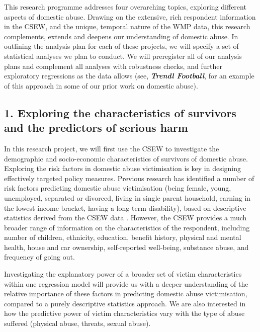 \documentclass[11pt, a4paper]{article}
\newcommand{\NS}[1] {{\textcolor{green}{#1}}}
\begin{document}
This research programme addresses four overarching topics, exploring different aspects of domestic abuse. Drawing on the extensive, rich respondent information in the CSEW, and the unique, temporal nature of the WMP data, this research complements, extends and deepens our understanding of domestic abuse. In outlining the analysis plan for each of these projects, we will specify a set of statistical analyses we plan to conduct. We will preregister all of our analysis plans and complement all analyses with robustness checks, and further exploratory regressions as the data allows (see, \textbf{\textit{Trendl Football}}, for an example of this approach in some of our prior work on domestic abuse).

\subsection*{1. Exploring the characteristics of survivors and the predictors of serious harm}


In this research project, we will first use the CSEW to investigate the demographic and socio-economic characteristics of survivors of domestic abuse. Exploring the risk factors in domestic abuse victimisation is key in designing effectively targeted policy measures. Previous research has identified a number of risk factors predicting domestic abuse victimisation (being female, young, unemployed, separated or divorced, living in single parent household, earning in the lowest income bracket, having a long-term disability), based on descriptive statistics derived from the CSEW data \cite{ONS}. However, the CSEW provides a much broader range of information on the characteristics of the respondent, including number of children, ethnicity, education, benefit history, physical and mental health, house and car ownership, self-reported well-being, substance abuse, and frequency of going out. 

Investigating the explanatory power of a broader set of victim characteristics within one regression model will provide us with a deeper understanding of the relative importance of these factors in predicting domestic abuse victimisation, compared to a purely descriptive statistics approach. We are also interested in how the predictive power of victim characteristics vary with the type of abuse suffered (physical abuse, threats, sexual abuse).
\end{document}
